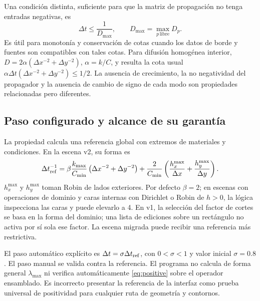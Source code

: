 \documentclass[11pt,a4paper]{article}
\newcommand{\dt}{\Delta t}
\newcommand{\code}[1]{\texttt{\detokenize{#1}}}
\begin{document}
Una condición distinta, suficiente para que la matriz de propagación no tenga
entradas negativas, es
\begin{equation}
 \dt\le\frac{1}{D_{\max}},\qquad D_{\max}=\max_{p\,\mathrm{libre}}D_p.
 \label{eq:positive}
\end{equation}
Es útil para monotonía y conservación de cotas cuando los datos de borde y
fuentes son compatibles con tales cotas. Para difusión homogénea interior,
$D=2\alpha(\Delta x^{-2}+\Delta y^{-2})$, $\alpha=k/C$, y resulta la cota
usual $\alpha\dt(\Delta x^{-2}+\Delta y^{-2})\le1/2$.
La ausencia de crecimiento, la no negatividad del propagador y la ausencia
de cambio de signo de cada modo son propiedades relacionadas pero diferentes.

\subsection{Paso configurado y alcance de su garantía}
La propiedad \code{dtLimit} calcula una referencia global con extremos de
materiales y condiciones. En la escena v2, su forma es
\begin{equation}
 \dt_{\rm ref}^{-1}=
 \beta\frac{k_{\max}}{C_{\min}}
       \left(\Delta x^{-2}+\Delta y^{-2}\right)
 +\frac{2}{C_{\min}}\left(\frac{h_x^{\max}}{\Delta x}
                         +\frac{h_y^{\max}}{\Delta y}\right).
 \label{eq:dtref}
\end{equation}
$h_x^{\max}$ y $h_y^{\max}$ toman Robin de lados exteriores. Por defecto
$\beta=2$; en escenas con operaciones de dominio y caras internas con
Dirichlet o Robin de $h>0$, la lógica inspecciona las caras y puede elevarlo
a 4. En v1, la selección del factor de cortes se basa en la forma del dominio;
una lista de ediciones sobre un rectángulo no activa por sí sola ese factor.
La escena migrada puede recibir una referencia más restrictiva.

El paso automático explícito es $\dt=\sigma\dt_{\rm ref}$, con
$0<\sigma<1$ y valor inicial $\sigma=0.8$. El paso manual se valida contra la
referencia. El programa no calcula de forma general $\lambda_{\max}$ ni
verifica automáticamente \eqref{eq:positive} sobre el operador ensamblado.
Es incorrecto presentar la referencia de la interfaz como prueba universal
de positividad para cualquier ruta de geometría y contornos.
\end{document}
